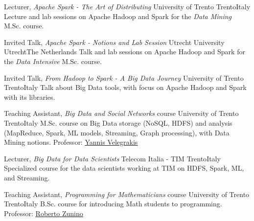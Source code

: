 \documentclass[10pt,a4paper,colorlinks,linkcolor=true]{moderncv}
\newcommand{\cvlink}[2]{\href{#1}{\ul{#2}}}
\begin{document}
  {Lecturer, \textit{Apache Spark - The Art of Distributing}}
  {University of Trento}
  {Trento}{Italy}
  {Lecture and lab sessions on Apache Hadoop and Spark for the \textit{Data Mining} M.Sc. course.} %


  {Invited Talk, \textit{Apache Spark - Notions and Lab Session}}
  {Utrecht University}
  {Utrecht}{The Netherlands}
  {Talk and lab sessions on Apache Hadoop and Spark for the \textit{Data Intensive} M.Sc. course.} %

  {Invited Talk, \textit{From Hadoop to Spark - A Big Data Journey}}
  {University of Trento}
  {Trento}{Italy}
  {Talk about Big Data tools, with focus on Apache Hadoop and Spark with its libraries.} %

  {Teaching Assistant, \textit{Big Data and Social Networks} course}
  {University of Trento}
  {Trento}{Italy}
  {M.Sc. course on Big Data storage (NoSQL, HDFS) and analysis (MapReduce, Spark, ML models, Streaming, Graph processing), with Data Mining notions. Professor: \cvlink{https://scholar.google.it/citations?user=FI1rYesAAAAJ}{Yannis Velegrakis}}

  {Lecturer, \textit{Big Data for Data Scientists}}
  {Telecom Italia - TIM}
  {Trento}{Italy}
  {Specialized course for the data scientists working at TIM on HDFS, Spark, ML, and Streaming.} %

  {Teaching Assistant, \textit{Programming for Mathematicians} course}
  {University of Trento}
  {Trento}{Italy}
  {B.Sc. course for introducing Math students to programming. Professor: \cvlink{https://scholar.google.it/citations?user=ojru0uEAAAAJ}{Roberto Zunino}}



\end{document}
